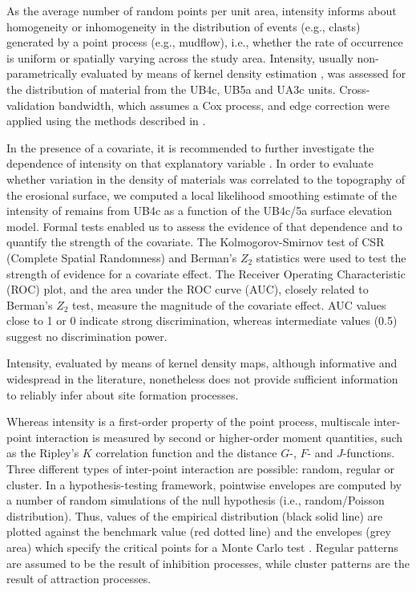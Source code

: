 \documentclass[preprint,authoryear,times]{elsarticle} %
\begin{document}
As the average number of random points per unit area, intensity informs about homogeneity or inhomogeneity in the distribution of events (e.g., clasts) generated by a point process (e.g., mudflow), i.e., whether the rate of occurrence is uniform or spatially varying across the study area. Intensity, usually non-parametrically evaluated by means of kernel density estimation \citep{Diggle1985}, was assessed for the distribution of material from the UB4c, UB5a and UA3c units. Cross-validation bandwidth, which assumes a Cox process, and edge correction were applied using the methods described in \cite{Diggle1985}.

In the presence of a covariate, it is recommended to further investigate the dependence of intensity on that explanatory variable \citep{Baddeley2012}. In order to evaluate whether variation in the density of materials was correlated to the topography of the erosional surface, we computed a local likelihood smoothing estimate of the intensity of remains from UB4c as a function of the UB4c/5a surface elevation model. Formal tests enabled us to assess the evidence of that dependence and to quantify the strength of the covariate. The Kolmogorov-Smirnov test of CSR (Complete Spatial Randomness) and Berman's $Z_2$ statistics were used to test the strength of evidence for a covariate effect. The Receiver Operating Characteristic (ROC) plot, and the area under the ROC curve (AUC), closely related to Berman's $Z_2$ test, measure the magnitude of the covariate effect. AUC values close to 1 or 0 indicate strong discrimination, whereas intermediate values (0.5) suggest no discrimination power.

Intensity, evaluated by means of kernel density maps, although informative and widespread in the literature, nonetheless does not provide sufficient information to reliably infer about site formation processes.

Whereas intensity is a first-order property of the point process, multiscale inter-point interaction is measured by second or higher-order moment quantities, such as the Ripley's $K$ correlation function \citep{Ripley1976,Ripley1977} and the distance $G$-, $F$- and $J$-functions. Three different types of inter-point interaction are possible: random, regular or cluster. In a hypothesis-testing framework, pointwise envelopes are computed by a number of random simulations of the null hypothesis (i.e., random/Poisson distribution). Thus, values of the empirical distribution (black solid line) are plotted against the benchmark value (red dotted line) and the envelopes (grey area) which specify the critical points for a Monte Carlo test \citep{Ripley1981}. Regular patterns are assumed to be the result of inhibition processes, while cluster patterns are the result of attraction processes. %
\end{document}
